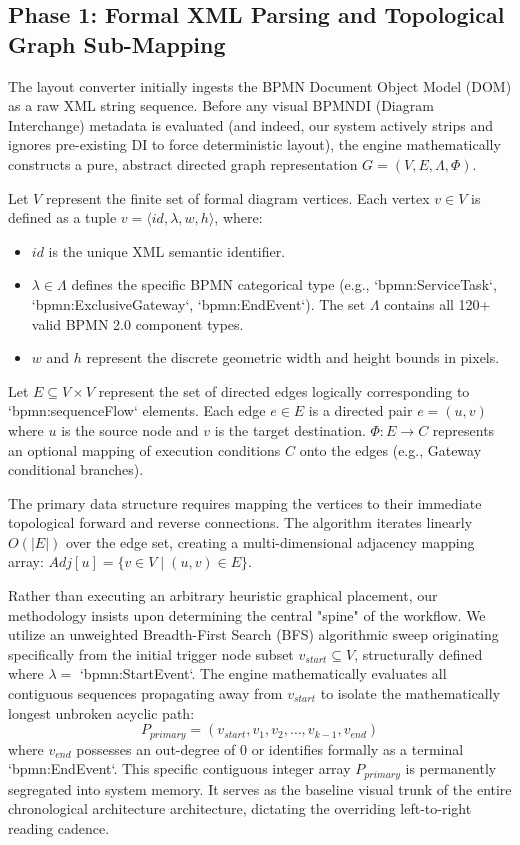 \documentclass[fleqn,10pt]{wlscirep}
\begin{document}
\subsection*{Phase 1: Formal XML Parsing and Topological Graph Sub-Mapping}
The layout converter initially ingests the BPMN Document Object Model (DOM) as a raw XML string sequence. Before any visual BPMNDI (Diagram Interchange) metadata is evaluated (and indeed, our system actively strips and ignores pre-existing DI to force deterministic layout), the engine mathematically constructs a pure, abstract directed graph representation $G = (V, E, \Lambda, \Phi)$. 

Let $V$ represent the finite set of formal diagram vertices. Each vertex $v \in V$ is defined as a tuple $v = \langle id, \lambda, w, h \rangle$, where:
\begin{itemize}
    \item $id$ is the unique XML semantic identifier.
    \item $\lambda \in \Lambda$ defines the specific BPMN categorical type (e.g., `bpmn:ServiceTask`, `bpmn:ExclusiveGateway`, `bpmn:EndEvent`). The set $\Lambda$ contains all 120+ valid BPMN 2.0 component types.
    \item $w$ and $h$ represent the discrete geometric width and height bounds in pixels.
\end{itemize}

Let $E \subseteq V \times V$ represent the set of directed edges logically corresponding to `bpmn:sequenceFlow` elements. Each edge $e \in E$ is a directed pair $e = (u, v)$ where $u$ is the source node and $v$ is the target destination. $\Phi: E \to C$ represents an optional mapping of execution conditions $C$ onto the edges (e.g., Gateway conditional branches).

The primary data structure requires mapping the vertices to their immediate topological forward and reverse connections. The algorithm iterates linearly $O(|E|)$ over the edge set, creating a multi-dimensional adjacency mapping array: $Adj[u] = \{v \in V \mid (u, v) \in E\}$. 

Rather than executing an arbitrary heuristic graphical placement, our methodology insists upon determining the central "spine" of the workflow. We utilize an unweighted Breadth-First Search (BFS) algorithmic sweep originating specifically from the initial trigger node subset $v_{start} \subseteq V$, structurally defined where $\lambda = $ `bpmn:StartEvent`. The engine mathematically evaluates all contiguous sequences propagating away from $v_{start}$ to isolate the mathematically longest unbroken acyclic path:
$$ P_{primary} = (v_{start}, v_{1}, v_{2}, \dots, v_{k-1}, v_{end}) $$
where $v_{end}$ possesses an out-degree of 0 or identifies formally as a terminal `bpmn:EndEvent`. This specific contiguous integer array $P_{primary}$ is permanently segregated into system memory. It serves as the baseline visual trunk of the entire chronological architecture architecture, dictating the overriding left-to-right reading cadence.
\end{document}
